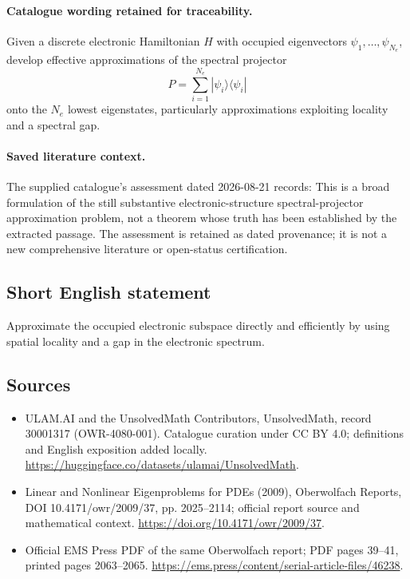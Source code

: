 \documentclass[11pt]{article}
\begin{document}
\paragraph{Catalogue wording retained for traceability.}
Given a discrete electronic Hamiltonian $H$ with occupied eigenvectors $\psi_1,\ldots,\psi_{N_e}$, develop effective approximations of the spectral projector $$P=\sum_{i=1}^{N_e}|\psi_i\rangle\langle\psi_i|$$ onto the $N_e$ lowest eigenstates, particularly approximations exploiting locality and a spectral gap.

\paragraph{Saved literature context.} The supplied catalogue's assessment dated 2026-08-21 records: This is a broad formulation of the still substantive electronic-structure spectral-projector approximation problem, not a theorem whose truth has been established by the extracted passage. The assessment is retained as dated provenance; it is not a new comprehensive literature or open-status certification.
\subsection{Short English statement}
Approximate the occupied electronic subspace directly and efficiently by using spatial locality and a gap in the electronic spectrum.
\subsection{Sources}
\begin{itemize}
\item[\hypertarget{source:30001317:1}{S1}] ULAM.AI and the UnsolvedMath Contributors, UnsolvedMath, record 30001317 (OWR-4080-001). Catalogue curation under CC BY 4.0; definitions and English exposition added locally.
\url{https://huggingface.co/datasets/ulamai/UnsolvedMath}.
\item[\hypertarget{source:30001317:2}{S2}] Linear and Nonlinear Eigenproblems for PDEs (2009), Oberwolfach Reports, DOI 10.4171/owr/2009/37, pp. 2025--2114; official report source and mathematical context.
\url{https://doi.org/10.4171/owr/2009/37}.
\item[\hypertarget{source:30001317:3}{S3}] Official EMS Press PDF of the same Oberwolfach report; PDF pages 39--41, printed pages 2063--2065.
\url{https://ems.press/content/serial-article-files/46238}.
\end{itemize}
\label{end:30001317}
\end{document}

